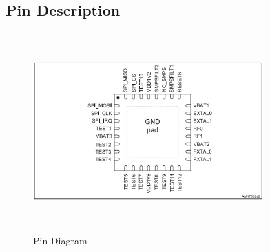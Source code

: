 \subsection{Pin Description}
\begin{figure}[ht]
	\centering
	\includegraphics[width=3.5in, height=3in]{images/pin_diagram.png}
	\caption{Pin Diagram}
\end{figure}
